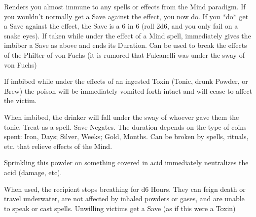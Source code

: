 {\CHYMISTRY[
  Name=Fulcanelli's Clarifying Elixir,
  Link=chymistry-fulcanelli-clarifying-elixir,
  Cost=500\AG,
  Duration=until Bivouac/0,
  Toxin=No,
  Narcotic=No 
]


Renders you almost immune to any spells or effects from the Mind paradigm.  If you wouldn't normally get a Save against the effect, you now do.  If you *do* get a Save against the effect, the Save is a 6 in 6 (roll 2d6, and you only fail on a snake eyes).  If taken while under the effect of a Mind spell, immediately gives the imbiber a Save as above and ends its Duration.  Can be used to break the effects of the Philter of von Fuchs (it is rumored that Fulcanelli was under the sway of von Fuchs)

\CHYMISTRY[
  Name=Liebnitz Purgation,
  Link=chymistry-liebnitz-purgation,
  Cost=500\AG,
  Duration=0 ,
  Toxin=No,
  Narcotic=No 
]

If imbibed while under the effects of an ingested Toxin (Tonic, drunk Powder, or Brew) the poison will be immediately vomited forth intact and will cease to affect the victim.  

\CHYMISTRY[
  Name=Philter of von Fuchs,
  Link=chymistry-philter-von-Fuchs,
  Cost=varies,
  Duration=varies ,
  Toxin=Yes,
  Narcotic=No 
]

When imbibed, the drinker will fall under the sway of whoever gave them the tonic.  Treat as a  spell.  Save Negates.  The duration depends on the type of coins spent:  Iron, Days; Silver, Weeks; Gold, Months.  Can be broken by spells, rituals, etc. that relieve effects of the Mind.


  \CHYMISTRY[
    Name=Dastin's Basic Talc,
    Link=chymistry-dastins-basic talc,
    Cost=500\FE,
    Duration=0 ,
    Toxin=No,
    Narcotic=No 
  ]


  Sprinkling this powder on something covered in acid immediately neutralizes the acid (damage, etc).


  \CHYMISTRY[
    Name=Mermaid's Kiss,
    Link=chymistry-mermaids-kiss,
    Cost=500\AG,
    Duration=0 ,
    Toxin=Yes,
    Narcotic=No 
  ]


  When used, the recipient stops breathing for d6 Hours.  They can feign death or travel underwater, are not affected by inhaled powders or gases, and are unable to speak or cast spells.  Unwilling victims get a Save (as if this were a Toxin)



}
